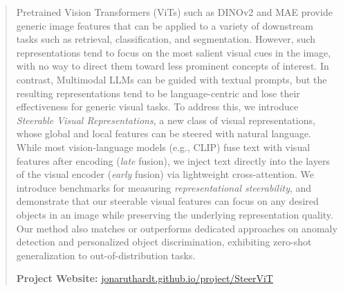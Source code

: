 
\vspace{-5mm}
\begin{abstract}
Pretrained Vision Transformers (ViTs) such as DINOv2 and MAE provide generic image features that can be applied to a variety of downstream tasks such as retrieval, classification, and segmentation.  
However, such representations tend to focus on the most salient visual cues in the image, with no way to direct them toward less prominent concepts of interest.  
In contrast, Multimodal LLMs can be guided with textual prompts,
but the resulting representations tend to be language-centric and lose their effectiveness for generic visual tasks.
To address this, we introduce
\textit{Steerable Visual Representations}, a new class of visual representations, whose global and local features can be steered with natural language.
While most vision-language models (e.g., CLIP) fuse text with visual features after encoding (\textit{late} fusion), we inject text directly into the layers of the visual encoder (\textit{early} fusion) via lightweight cross-attention. 
We introduce benchmarks for measuring \textit{representational steerability}, and demonstrate that our steerable visual features can focus on 
any desired objects in an image while preserving the underlying representation quality.\textbf{}
Our method also matches or outperforms dedicated approaches
on anomaly detection and personalized object discrimination, exhibiting zero-shot generalization to out-of-distribution tasks.
\vspace{1mm}

\textbf{Project Website:} 
\href{https://jonaruthardt.github.io/project/SteerViT/}{jonaruthardt.github.io/project/SteerViT}
\vspace{-8mm}
\end{abstract}

